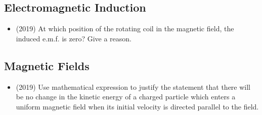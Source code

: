 \documentclass{article}
\begin{document}
\subsection{Electromagnetic Induction}
\begin{itemize}
\item (2019)  At which position of the rotating coil in the magnetic field, the induced e.m.f. is zero? Give a reason. 
\end{itemize}

\subsection{Magnetic Fields}
\begin{itemize}
\item (2019)  Use mathematical expression to justify the statement that there will be no change in the kinetic energy of a charged particle which enters a uniform magnetic field when its initial velocity is directed parallel to the field.

\end{itemize}
\end{document}
